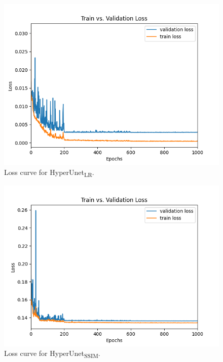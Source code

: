 \documentclass{article}
\begin{document}
\begin{figure}[!htb]
    \centering
    \includegraphics[width=\textwidth]{figs/ClassicUnet_LR/curves/loss_curve.png}
    \caption{Loss curve for HyperUnet\textsubscript{LR}.}
    \label{fig:loss_curve_HyperNetLR_model}
\end{figure}

\begin{figure}[!htb]
    \centering
    \includegraphics[width=\textwidth]{figs/ClassicUnetSSIM_LR/curves/loss_curve.png}
    \caption{Loss curve for HyperUnet\textsubscript{SSIM}.}
    \label{fig:loss_curve_UnetSSIM_model}
\end{figure}
\end{document}

